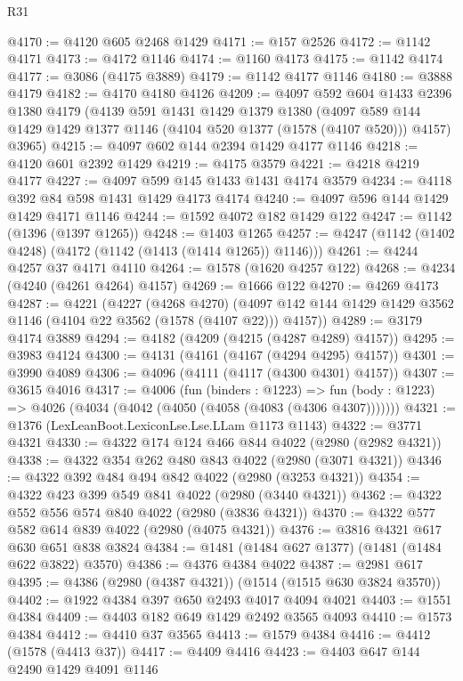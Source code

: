 \begin{lexlean}{R31}
\begin{coremodule}
@4170 := @4120 @605 @2468 @1429
@4171 := @157 @2526
@4172 := @1142 @4171
@4173 := @4172 @1146
@4174 := @1160 @4173
@4175 := @1142 @4174
@4177 := @3086 (@4175 @3889)
@4179 := @1142 @4177 @1146
@4180 := @3888 @4179
@4182 := @4170 @4180 @4126
@4209 := @4097
    @592
    @604
    @1433
    @2396
    @1380
    @4179
    (@4139
      @591
      @1431
      @1429
      @1379
      @1380
      (@4097 @589 @144 @1429 @1429 @1377 @1146 (@4104 @520 @1377 (@1578 (@4107 @520))) @4157)
      @3965)
@4215 := @4097 @602 @144 @2394 @1429 @4177 @1146
@4218 := @4120 @601 @2392 @1429
@4219 := @4175 @3579
@4221 := @4218 @4219 @4177
@4227 := @4097 @599 @145 @1433 @1431 @4174 @3579
@4234 := @4118 @392 @84 @598 @1431 @1429 @4173 @4174
@4240 := @4097 @596 @144 @1429 @1429 @4171 @1146
@4244 := @1592 @4072 @182 @1429 @122
@4247 := @1142 (@1396 (@1397 @1265))
@4248 := @1403 @1265
@4257 := @4247 (@1142 (@1402 @4248) (@4172 (@1142 (@1413 (@1414 @1265)) @1146)))
@4261 := @4244 @4257 @37 @4171 @4110
@4264 := @1578 (@1620 @4257 @122)
@4268 := @4234 (@4240 (@4261 @4264) @4157)
@4269 := @1666 @122
@4270 := @4269 @4173
@4287 := @4221
    (@4227
      (@4268 @4270)
      (@4097 @142 @144 @1429 @1429 @3562 @1146 (@4104 @22 @3562 (@1578 (@4107 @22))) @4157))
@4289 := @3179 @4174 @3889
@4294 := @4182 (@4209 (@4215 (@4287 @4289) @4157))
@4295 := @3983 @4124
@4300 := @4131 (@4161 (@4167 (@4294 @4295) @4157))
@4301 := @3990 @4089
@4306 := @4096 (@4111 (@4117 (@4300 @4301) @4157))
@4307 := @3615 @4016
@4317 := @4006
    (fun (binders : @1223) =>
    fun (body : @1223) => @4026 (@4034 (@4042 (@4050 (@4058 (@4083 (@4306 @4307)))))))
@4321 := @1376 (LexLeanBoot.LexiconLse.Lse.LLam @1173 @1143)
@4322 := @3771 @4321
@4330 := @4322 @174 @124 @466 @844 @4022 (@2980 (@2982 @4321))
@4338 := @4322 @354 @262 @480 @843 @4022 (@2980 (@3071 @4321))
@4346 := @4322 @392 @484 @494 @842 @4022 (@2980 (@3253 @4321))
@4354 := @4322 @423 @399 @549 @841 @4022 (@2980 (@3440 @4321))
@4362 := @4322 @552 @556 @574 @840 @4022 (@2980 (@3836 @4321))
@4370 := @4322 @577 @582 @614 @839 @4022 (@2980 (@4075 @4321))
@4376 := @3816 @4321 @617 @630 @651 @838 @3824
@4384 := @1481 (@1484 @627 @1377) (@1481 (@1484 @622 @3822) @3570)
@4386 := @4376 @4384 @4022
@4387 := @2981 @617
@4395 := @4386 (@2980 (@4387 @4321)) (@1514 (@1515 @630 @3824 @3570))
@4402 := @1922 @4384 @397 @650 @2493 @4017 @4094 @4021
@4403 := @1551 @4384
@4409 := @4403 @182 @649 @1429 @2492 @3565 @4093
@4410 := @1573 @4384
@4412 := @4410 @37 @3565
@4413 := @1579 @4384
@4416 := @4412 (@1578 (@4413 @37))
@4417 := @4409 @4416
@4423 := @4403 @647 @144 @2490 @1429 @4091 @1146

\end{coremodule}
\end{lexlean}
